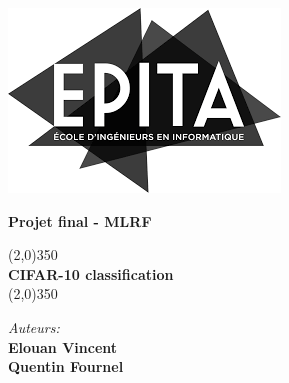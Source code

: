  \begin{titlepage}
\begin{center}
\thispagestyle{emptyt}
\vspace{2cm}
\includegraphics[scale=0.3]{./logo/epita.png}

\vspace{2cm}

\textbf{\Large Projet final - MLRF}
\\[0.2cm]

\vspace{0.4cm}
\hspace{0.3cm}

\begin{center}
\line(2,0){350}\\
\vspace*{0.5cm} \textbf{{\LARGE{CIFAR-10 classification}}}\\
\vspace*{0.5cm}\line(2,0){350}\\
\end{center}

\hspace{0.7cm}

 \large \emph{Auteurs:}\\
\textbf{\Large{Elouan Vincent \\ Quentin Fournel}} \\[1.cm]



\end{center}
\end{titlepage}
